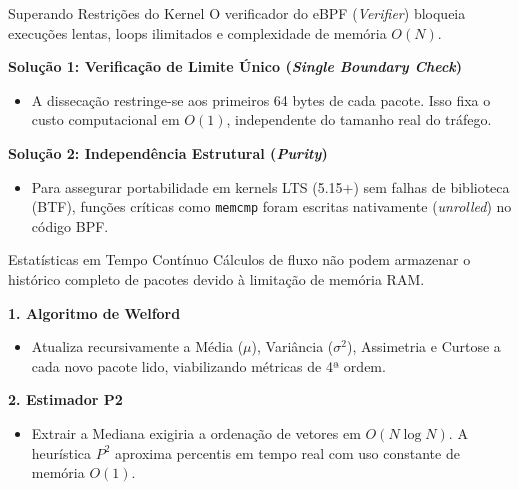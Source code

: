\documentclass[aspectratio=169]{beamer}
\begin{document}
\begin{frame}{Superando Restrições do Kernel}
    O verificador do eBPF (\textit{Verifier}) bloqueia execuções lentas, loops ilimitados e complexidade de memória $O(N)$.
    \vspace{0.3cm}
    
    \textbf{Solução 1: Verificação de Limite Único (\textit{Single Boundary Check})}
    \begin{itemize}
        \item A dissecação restringe-se aos primeiros 64 bytes de cada pacote. Isso fixa o custo computacional em $O(1)$, independente do tamanho real do tráfego.
    \end{itemize}

    \textbf{Solução 2: Independência Estrutural (\textit{Purity})}
    \begin{itemize}
        \item Para assegurar portabilidade em kernels LTS (5.15+) sem falhas de biblioteca (BTF), funções críticas como \texttt{memcmp} foram escritas nativamente (\textit{unrolled}) no código BPF.
    \end{itemize}
\end{frame}

\begin{frame}{Estatísticas em Tempo Contínuo}
    Cálculos de fluxo não podem armazenar o histórico completo de pacotes devido à limitação de memória RAM.
    
    \vspace{0.3cm}
    \textbf{1. Algoritmo de Welford}
    \begin{itemize}
        \item Atualiza recursivamente a Média ($\mu$), Variância ($\sigma^2$), Assimetria e Curtose a cada novo pacote lido, viabilizando métricas de 4ª ordem.
    \end{itemize}
    
    \vspace{0.2cm}
    \textbf{2. Estimador P2}
    \begin{itemize}
        \item Extrair a Mediana exigiria a ordenação de vetores em $O(N \log N)$. A heurística $P^2$ aproxima percentis em tempo real com uso constante de memória $O(1)$.
    \end{itemize}
\end{frame}
\end{document}
